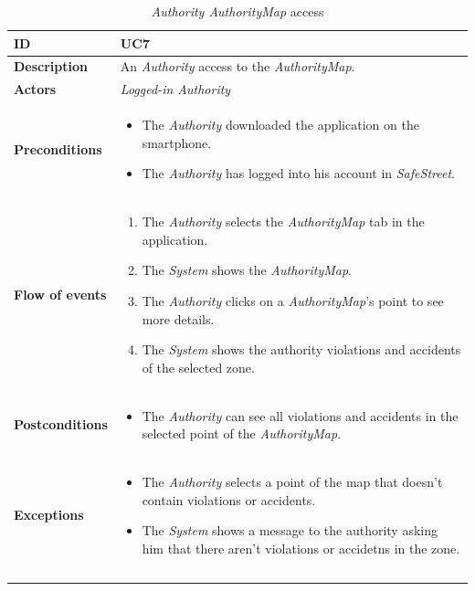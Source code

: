 \documentclass {article}
\begin{document}
	\begin{longtable}{| p{3 cm} | p{10.5 cm} |} 
			\hline
			{\bf ID} & UC7 \\
			\hline
			{\bf Description} & An {\it Authority} access to the {\it AuthorityMap}.\\
			\hline
			{\bf Actors} & {\it Logged-in Authority}\\
			\hline
			{\bf Preconditions} & 	
			\begin{itemize}
				\item The {\it Authority} downloaded the application on the smartphone.
				\item The {\it Authority} has logged into his account in {\it SafeStreet}.
			\end{itemize}
			\\
			\hline
			{\bf Flow of events} &	
			\begin{enumerate}
				\item The {\it Authority} selects the {\it AuthorityMap} tab in the application.
				\item The {\it System} shows the {\it AuthorityMap}.
				\item The {\it Authority} clicks on a {\it AuthorityMap}'s point to see more details. 
				\item The {\it System} shows the authority violations and accidents of the selected zone. 
			\end{enumerate}
			\\
			\hline
			{\bf Postconditions} & 
			\begin{itemize}
				\item The {\it Authority} can see all violations and accidents in the selected point of the {\it AuthorityMap}.
			\end{itemize}
			\\
			\hline
			{\bf Exceptions} & 	
			\begin{itemize}
				\item The {\it Authority} selects a point of the map that doesn't contain violations or accidents.
				\item The {\it System} shows a message to the authority asking him that there aren't violations or accidetns in the zone.
			\end{itemize}
			\\ \\
			\hline
			\caption{{\it Authority AuthorityMap} access}
			\end{longtable}
			
\end{document}
